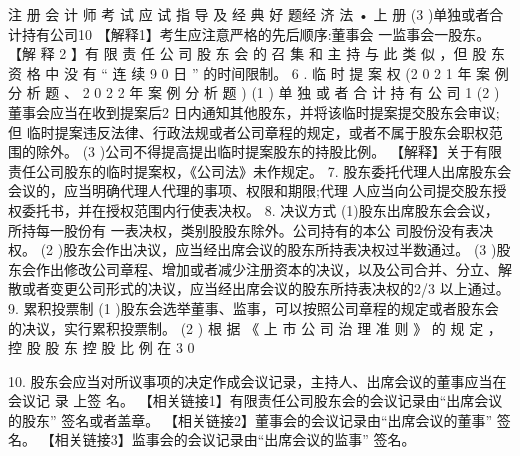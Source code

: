 \documentclass[UTF8,12pt]{ctexart}
\numberwithin{equation}{section} %
\numberwithin{figure}{section}
\numberwithin{table}{section}
\begin{document}
	注 册 会 计 师 考 试 应 试 指 导 及 经 典 好 题经 济 法 • 上 册
	(3 )单独或者合计持有公司10%
	【解释1】考生应注意严格的先后顺序:董事会 一监事会一股东。
	【解 释 2 】有 限 责 任 公 司 股 东 会 的 召 集 和 主 持 与 此 类 似 ，但 股 东 资 格 中 没 有 “ 连 续 9 0 日 ” 的时间限制。
	6 . 临 时 提 案 权 (2 0 2 1 年 案 例 分 析 题 、 2 0 2 2 年 案 例 分 析 题 )
	(1 ) 单 独 或 者 合 计 持 有 公 司 1 %
	(2 )董事会应当在收到提案后2 日内通知其他股东，并将该临时提案提交股东会审议;但 临时提案违反法律、行政法规或者公司章程的规定，或者不属于股东会职权范围的除外。
	(3 )公司不得提高提出临时提案股东的持股比例。
	【解释】关于有限责任公司股东的临时提案权，《公司法》未作规定。
	7. 股东委托代理人出席股东会会议的，应当明确代理人代理的事项、权限和期限;代理 人应当向公司提交股东授权委托书，并在授权范围内行使表决权。
	8. 决议方式
	(1)股东出席股东会会议，所持每一股份有 一表决权，类别股股东除外。公司持有的本公 司股份没有表决权。
	(2 )股东会作出决议，应当经出席会议的股东所持表决权过半数通过。
	(3 )股东会作出修改公司章程、增加或者减少注册资本的决议，以及公司合并、分立、解 散或者变更公司形式的决议，应当经出席会议的股东所持表决权的2/3 以上通过。
	9. 累积投票制
	(1 )股东会选举董事、监事，可以按照公司章程的规定或者股东会的决议，实行累积投票制。 (2 ) 根 据 《 上 市 公 司 治 理 准 则 》 的 规 定 ， 控 股 股 东 控 股 比 例 在 3 0 %
	
	10. 股东会应当对所议事项的决定作成会议记录，主持人、出席会议的董事应当在会议记 录 上签 名。
	【相关链接1】有限责任公司股东会的会议记录由“出席会议的股东” 签名或者盖章。 【相关链接2】董事会的会议记录由“出席会议的董事” 签名。 【相关链接3】监事会的会议记录由“出席会议的监事” 签名。
	
\end{document}

